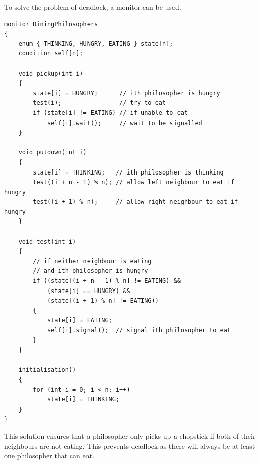 \documentclass{article}
\begin{document}
To solve the problem of deadlock, a monitor can be used.
\begin{verbatim}
monitor DiningPhilosophers
{
    enum { THINKING, HUNGRY, EATING } state[n];
    condition self[n];

    void pickup(int i)
    {
        state[i] = HUNGRY;      // ith philosopher is hungry
        test(i);                // try to eat
        if (state[i] != EATING) // if unable to eat
            self[i].wait();     // wait to be signalled
    }

    void putdown(int i)
    {
        state[i] = THINKING;   // ith philosopher is thinking
        test((i + n - 1) % n); // allow left neighbour to eat if hungry
        test((i + 1) % n);     // allow right neighbour to eat if hungry
    }

    void test(int i)
    {
        // if neither neighbour is eating
        // and ith philosopher is hungry
        if ((state[(i + n - 1) % n] != EATING) &&
            (state[i] == HUNGRY) &&
            (state[(i + 1) % n] != EATING))
        {
            state[i] = EATING;
            self[i].signal();  // signal ith philosopher to eat
        }
    }

    initialisation()
    {
        for (int i = 0; i < n; i++)
            state[i] = THINKING;
    }
}
\end{verbatim}
This solution ensures that a philosopher only picks up a chopstick if
both of their neighbours are not eating. This prevents deadlock as
there will always be at least one philosopher that can eat.
\end{document}
